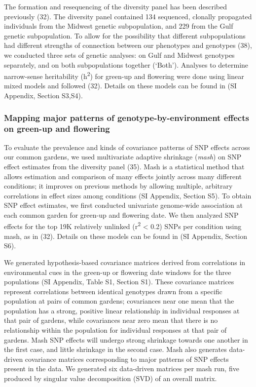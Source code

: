 \documentclass[
  9pt,
  twocolumn,
  twoside]{pnas-new}
\begin{document}
The formation and resequencing of the diversity panel has been described
previously (32). The diversity panel contained 134 sequenced, clonally
propagated individuals from the Midwest genetic subpopulation, and 229
from the Gulf genetic subpopulation. To allow for the possibility that
different subpopulations had different strengths of connection between
our phenotypes and genotypes (38), we conducted three sets of genetic
analyses: on Gulf and Midwest genotypes separately, and on both
subpopulations together (`Both'). Analyses to determine narrow-sense
heritability (h\textsuperscript{2}) for green-up and flowering were done
using linear mixed models and followed (32). Details on these models can
be found in (SI Appendix, Section S3,S4).

\subsubsection{Mapping major patterns of genotype-by-environment effects
on green-up and
flowering}\label{mapping-major-patterns-of-genotype-by-environment-effects-on-green-up-and-flowering}

To evaluate the prevalence and kinds of covariance patterns of SNP
effects across our common gardens, we used multivariate adaptive
shrinkage (\emph{mash}) on SNP effect estimates from the diversity panel
(35). Mash is a statistical method that allows estimation and comparison
of many effects jointly across many different conditions; it improves on
previous methods by allowing multiple, arbitrary correlations in effect
sizes among conditions (SI Appendix, Section S5). To obtain SNP effect
estimates, we first conducted univariate genome-wide association at each
common garden for green-up and flowering date. We then analyzed SNP
effects for the top 19K relatively unlinked (r\textsuperscript{2}
\textless{} 0.2) SNPs per condition using mash, as in (32). Details on
these models can be found in (SI Appendix, Section S6).

We generated hypothesis-based covariance matrices derived from
correlations in environmental cues in the green-up or flowering date
windows for the three populations (SI Appendix, Table S1, Section S1).
These covariance matrices represent correlations between identical
genotypes drawn from a specific population at pairs of common gardens;
covariances near one mean that the population has a strong, positive
linear relationship in individual responses at that pair of gardens,
while covariances near zero mean that there is no relationship within
the population for individual responses at that pair of gardens. Mash
SNP effects will undergo strong shrinkage towards one another in the
first case, and little shrinkage in the second case. Mash also generates
data-driven covariance matrices corresponding to major patterns of SNP
effects present in the data. We generated six data-driven matrices per
mash run, five produced by singular value decomposition (SVD) of an
overall matrix.
\end{document}
